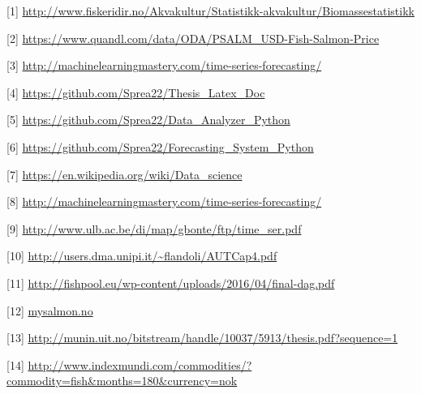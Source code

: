 
[1] \url{http://www.fiskeridir.no/Akvakultur/Statistikk-akvakultur/Biomassestatistikk}


[2] \url{https://www.quandl.com/data/ODA/PSALM_USD-Fish-Salmon-Price}


[3] \url{http://machinelearningmastery.com/time-series-forecasting/}


[4] \url{https://github.com/Sprea22/Thesis_Latex_Doc}


[5] \url{https://github.com/Sprea22/Data_Analyzer_Python}


[6] \url{https://github.com/Sprea22/Forecasting_System_Python}

[7] \url{https://en.wikipedia.org/wiki/Data_science}

[8] \url{http://machinelearningmastery.com/time-series-forecasting/}

[9] \url{http://www.ulb.ac.be/di/map/gbonte/ftp/time_ser.pdf}

[10] \url{http://users.dma.unipi.it/~flandoli/AUTCap4.pdf}

[11] \url{http://fishpool.eu/wp-content/uploads/2016/04/final-dag.pdf}

[12] \url{mysalmon.no}

[13] \url{http://munin.uit.no/bitstream/handle/10037/5913/thesis.pdf?sequence=1}

[14] \url{http://www.indexmundi.com/commodities/?commodity=fish&months=180&currency=nok}